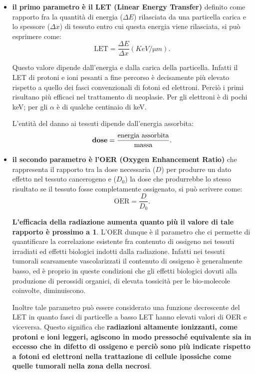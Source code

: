 \documentclass[a4paper,11pt,twoside,openany]{book}
\theoremstyle{definition}
\theoremstyle{plain}
\theoremstyle{plain}
\theoremstyle{definition}
\begin{document}
\begin{itemize}
\item \textbf{il primo parametro è il LET (Linear Energy Transfer)} definito come rapporto fra la quantità di energia ($\Delta E$) rilasciata da una particella carica e lo spessore ($\Delta x$) di tessuto entro cui questa energia viene rilasciata, si può esprimere come: 
\begin{equation}
\textrm{LET}=\frac{\Delta E}{\Delta x} (\si{KeV/\micro m}).
\end{equation}

Questo valore dipende dall'energia e dalla carica della particella. Infatti il LET di protoni e ioni pesanti a fine percorso è decisamente più elevato rispetto a quello dei fasci convenzionali di fotoni ed elettroni. Perciò i primi risultano più efficaci nel trattamento di neoplasie. Per gli elettroni è di pochi keV; per gli $\alpha$ è di qualche centinaio di keV.

L'entità del danno ai tessuti dipende dall'energia assorbita:
\begin{equation}
\textrm{\textbf{dose}}=\frac{\textrm{energia assorbita}}{\textrm{massa}}.
\end{equation}


\item \textbf{il secondo parametro è l'OER (Oxygen Enhancement Ratio)} che rappresenta il rapporto tra la dose necessaria ($D$) per produrre un dato effetto nel tessuto cancerogeno e ($D_0$) la dose che produrrebbe lo stesso risultato se il tessuto fosse completamente ossigenato, si può scrivere come:
\begin{equation}
\textrm{OER}=\frac{D}{D_0}.
\end{equation}

\textbf{L'efficacia della radiazione aumenta quanto più il valore di tale rapporto è prossimo a 1}. L'OER dunque è il parametro che ci permette di quantificare la correlazione esistente fra contenuto di ossigeno nei tessuti irradiati ed effetti biologici indotti dalla radiazione. Infatti nei tessuti tumorali scarsamente vascolarizzati il contenuto di ossigeno è generalmente basso, ed è proprio in queste condizioni che gli effetti biologici dovuti alla produzione di perossidi organici, di elevata tossicità per le bio-molecole coinvolte, diminuiscono.

Inoltre tale parametro può essere considerato una funzione decrescente del LET in quanto fasci di particelle a basso LET hanno elevati valori di OER e viceversa. Questo significa che \textbf{radiazioni altamente ionizzanti, come protoni e ioni leggeri, agiscono in modo pressoché equivalente sia in eccesso che in difetto di ossigeno e perciò sono più indicate rispetto a fotoni ed elettroni nella trattazione di cellule ipossiche come quelle tumorali nella zona della necrosi}.


\end{itemize}
\end{document}
